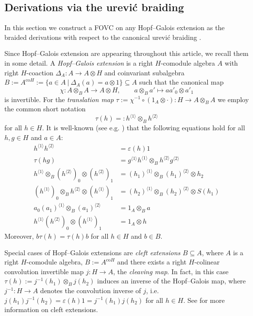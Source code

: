 \documentclass{article}
\theoremstyle{definition}
\begin{document}
	
	
	
	
	\subsection{Derivations via the \DJ ur\dj evi\'c braiding}\label{sec:durd}
	
	In this section we construct a FOVC on any Hopf--Galois extension as the braided derivations with respect to the canonical \DJ ur\dj evi\'c braiding \cite{DurdBraid}.
	
	Since Hopf--Galois extension are appearing throughout this article, we recall them in some detail.
	A \textit{Hopf--Galois extension} \cite{KrTa} is a right $H$-comodule algebra $A$ with right $H$-coaction $\Delta_A\colon A\to A\otimes H$ and coinvariant subalgebra $B:=A^{\mathrm{co}H}:=\{a\in A~|~\Delta_A(a)=a\otimes 1\}\subseteq A$ such that the canonical map
	$$
	\chi\colon A\otimes_BA\to A\otimes H,\qquad a\otimes_Ba'\mapsto aa'_0\otimes a'_1
	$$
	is invertible. For the \textit{translation map} $\tau:=\chi^{-1}\circ(1_A\otimes\cdot)\colon H\to A\otimes_BA$ we employ the common short notation 
	$$
	\tau(h)=:h^{\langle 1\rangle}\otimes_Bh^{\langle 2\rangle}
	$$ 
	for all $h\in H$. It is well-known (see e.g. \cite{Brz}) that the following equations hold for all $h,g\in H$ and $a\in A$:
	\begin{align}
		h^{\langle 1\rangle}h^{\langle 2\rangle}&=\varepsilon(h)1 \label{transl1}\\
		\tau(hg)&=g^{\langle 1\rangle}h^{\langle 1\rangle}\otimes_Bh^{\langle 2\rangle}g^{\langle 2\rangle}\label{transl2}\\
		h^{\langle 1\rangle}\otimes_B(h^{\langle 2\rangle})_0\otimes(h^{\langle 2\rangle})_1&=(h_1)^{\langle 1\rangle}\otimes_B(h_1)^{\langle 2\rangle}\otimes h_2\\
		(h^{\langle 1\rangle})_0\otimes_Bh^{\langle 2\rangle}\otimes(h^{\langle 1\rangle})_1&=(h_2)^{\langle 1\rangle}\otimes_B(h_2)^{\langle 2\rangle}\otimes S(h_1)\label{transl4}\\
		a_0(a_1)^{\langle 1\rangle}\otimes_B(a_1)^{\langle 2\rangle}&=1_A\otimes_Ba\label{transl5}\\
		h^{\langle 1\rangle}(h^{\langle 2\rangle})_0\otimes(h^{\langle 1\rangle})_1
		&=1_A\otimes h
	\end{align}
	Moreover, $b\tau(h)=\tau(h)b$ for all $h\in H$ and $b\in B$. 
	
	Special cases of Hopf--Galois extensions are \textit{cleft extensions} $B\subseteq A$, where $A$ is a right $H$-comodule algebra, $B:=A^{\mathrm{co}H}$ and there exists a right $H$-colinear convolution invertible map $j\colon H\to A$, the \textit{cleaving map}. In fact, in this case $\tau(h):=j^{-1}(h_1)\otimes_Bj(h_2)$ induces an inverse of the Hopf--Galois map, where $j^{-1}\colon H\to A$ denotes the convolution inverse of $j$, i.e. $j(h_1)j^{-1}(h_2)=\varepsilon(h)1=j^{-1}(h_1)j(h_2)$ for all $h\in H$. See \cite[Section 7.2]{mont} for more information on cleft extensions.
	
\end{document}
